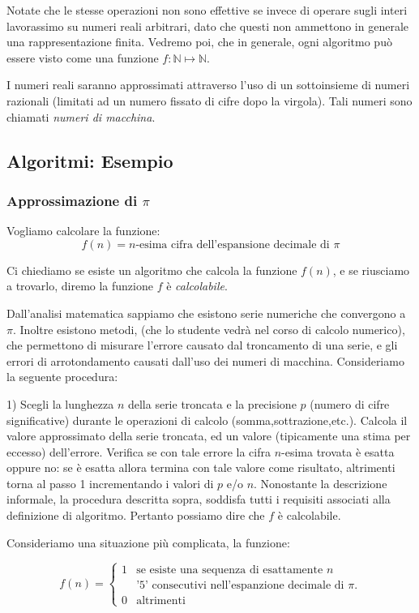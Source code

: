 Notate che le stesse operazioni non sono effettive se invece di operare sugli interi lavorassimo su numeri reali arbitrari, dato che questi non ammettono in generale una rappresentazione finita. Vedremo poi, che in generale, ogni algoritmo può essere visto come una funzione $f: \mathbb{N} \mapsto \mathbb{N}$.

I numeri reali saranno approssimati attraverso l'uso di un sottoinsieme di numeri razionali (limitati ad un numero fissato di cifre dopo la virgola). Tali numeri sono chiamati \emph{numeri di macchina}.

\subsection{Algoritmi: Esempio}
\subsubsection{Approssimazione di $\pi$}

Vogliamo calcolare la funzione:
\[ f(n) = n\mbox{-esima cifra dell'espansione decimale di } \pi \]

Ci chiediamo se esiste un algoritmo che calcola la funzione $f(n)$, e
se riusciamo a trovarlo, diremo la funzione $f$ è \emph{calcolabile}.

Dall'analisi matematica sappiamo che esistono serie numeriche che
convergono a $\pi$. Inoltre esistono metodi, (che lo studente vedrà
nel corso di calcolo numerico), che permettono di misurare l'errore
causato dal troncamento di una serie, e gli errori di arrotondamento
causati dall'uso dei numeri di macchina.  Consideriamo la seguente
procedura:

1) Scegli la lunghezza $n$ della serie troncata e la precisione $p$
(numero di cifre significative) durante le operazioni di calcolo
(somma,sottrazione,etc.).  Calcola il valore approssimato della serie
troncata, ed un valore (tipicamente una stima per eccesso)
dell'errore.  Verifica se con tale errore la cifra $n$-esima trovata è
esatta oppure no: se è esatta allora termina con tale valore come
risultato, altrimenti torna al passo 1 incrementando i valori di $p$
e/o $n$.  Nonostante la descrizione informale, la procedura descritta
sopra, soddisfa tutti i requisiti associati alla definizione di
algoritmo. Pertanto possiamo dire che $f$ è calcolabile.

Consideriamo una situazione più complicata, la funzione:

\[
f(n) = \begin{cases}
1 & \mbox{se esiste una sequenza di esattamente } n\\
  &  \mbox{'5' consecutivi nell'espanzione decimale di } \pi.\\
0 & \mbox{altrimenti}
\end{cases} \]

